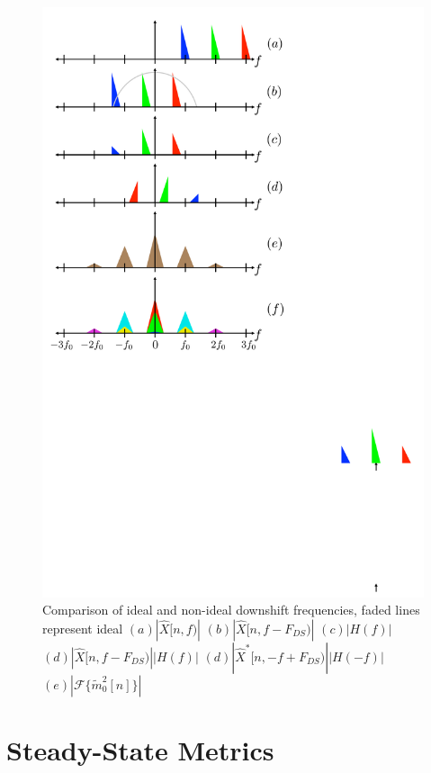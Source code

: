 \documentclass [11pt, proquest,oneside] {ganter_thesis}[2015/03/03]
\begin{document}
\begin{figure}[!ht]
  \centering
    \includegraphics[width=1\textwidth]{downshift_effects} 
    \caption{Comparison of ideal and non-ideal downshift frequencies, faded lines represent ideal
			    $(a) | \widehat{X}[n,f) |$   
    				$(b) | \widehat{X}[n,f - F_{DS}) |$  
				$(c) | H(f) |$
    				$(d) | \widehat{X}[n,f - F_{DS}) | | H(f) |$  
				$(d) | \widehat{X}^*[n,-f + F_{DS}) | | H(-f) |$
				$(e) | \mathcal{F} \{ \tilde{m}_0^2[n] \} |$ }\label{fig:downshift_effects}
\end{figure}

\section{Steady-State Metrics}
\end{document}
